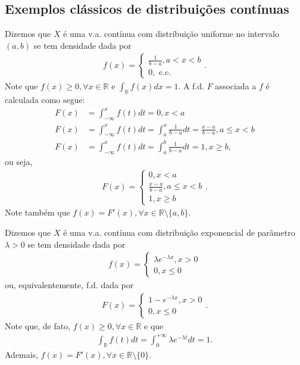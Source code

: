 \documentclass[../Notas.tex]{subfiles}
\begin{document}
\subsection{Exemplos clássicos de distribuições contínuas}
\begin{example}
Dizemos que $X$ é uma v.a. contínua com distribuição uniforme no intervalo $(a,b)$ se tem densidade dada por
\begin{align*}
    f(x) = \begin{cases}
    \frac{1}{b-a}, a < x < b \\
    0, \text{ c.c.}
    \end{cases}.
\end{align*}
Note que $f(x)\geq 0, \forall x\in\mathbb{R}$ e $\displaystyle{ \int_{\mathbb{R}} f(x) dx = 1 }$. A f.d. $F$ associada a $f$ é calculada como segue:
\begin{align*}
    F(x) &= \int_{-\infty}^x f(t) dt = 0, x < a \\
    F(x) &= \int_{-\infty}^x f(t) dt = \int_a^x \frac{1}{b-a} dt = \frac{x-a}{b-a}, a\leq x < b \\
    F(x) &= \int_{-\infty}^x f(t) dt = \int_a^b \frac{1}{b-a} dt = 1, x \geq b, 
\end{align*}
ou seja,
\begin{align*}
    F(x) = \begin{cases}
    0, x<a \\
    \frac{x-a}{b-a}, a\leq x < b \\
    1, x\geq b
    \end{cases}.
\end{align*}
Note também que $f(x) = F'(x), \forall x\in\mathbb{R}\setminus\{a,b\}$.
\end{example}

\begin{example}
Dizemos que $X$ é uma v.a. contínua com distribuição exponencial de parâmetro $\lambda > 0$ se tem densidade dada por
\begin{align*}
    f(x) = \begin{cases}
    \lambda e^{-\lambda x}, x > 0 \\
    0, x \leq 0
    \end{cases}
\end{align*}
ou, equivalentemente, f.d. dada por
\begin{align*}
    F(x) = \begin{cases}
    1 - e^{-\lambda x}, x > 0 \\
    0, x\leq 0
    \end{cases}.
\end{align*}
Note que, de fato, $f(x) \geq 0, \forall x\in\mathbb{R}$ e que
\begin{align*}
    \int_{\mathbb{R}} f(t) dt = \int_0^{+\infty} \lambda e^{-\lambda t} dt = 1.
\end{align*}
Ademais, $f(x) = F'(x), \forall x\in\mathbb{R}\setminus\{0\}$.
\end{example}
\end{document}
